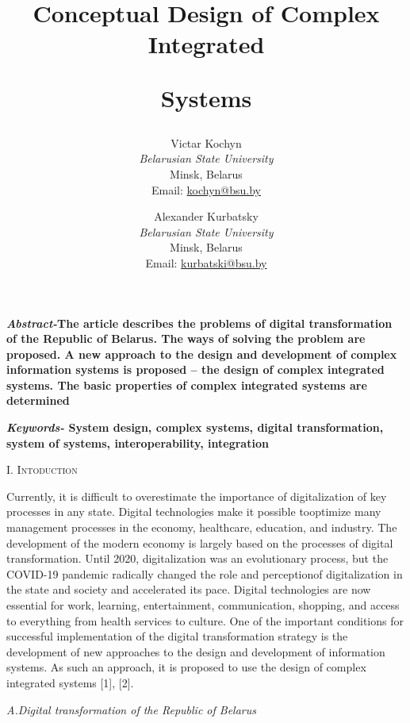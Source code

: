 \documentclass{article}
\title{Conceptual Design of Complex Integrated 
       
Systems}
\author{Victar Kochyn \\ \textit{Belarusian State University} \\ Minsk, Belarus\\ Email: \href{mailto:kochyn@bsu.by}{kochyn@bsu.by} 
   \and Alexander Kurbatsky \\ \textit{Belarusian State University} \\ Minsk, Belarus \\ Email: \href{mailto:kurbatski@bsu.by}{kurbatski@bsu.by} }
\date{}
\begin{document}
 
\maketitle

\begin{multicols}{2}
\setcounter{page}{33}
\textbf{\textit{Abstract-}The article describes the problems of digital
transformation of the Republic of Belarus. The ways of
solving the problem are proposed. A new approach to the
design and development of complex information systems
is proposed – the design of complex integrated systems.
The basic properties of complex integrated systems are
determined
}

\textbf{\textit{Keywords-} System design, complex systems, digital
transformation, system of systems, interoperability, integration}

\begin{center}
 \vspace{-3pt}
    {\large I. \textsc{Intoduction}}
\end{center}

Currently, it is difficult to overestimate the importance
of digitalization of key processes in any state. Digital
technologies make it possible tooptimize many management processes in the economy, healthcare, education,
and industry. The development of the modern economy is
largely based on the processes of digital transformation.
Until 2020, digitalization was an evolutionary process,
but the COVID-19 pandemic radically changed the role
and perceptionof digitalization in the state and society
and accelerated its pace. Digital technologies are now
essential for work, learning, entertainment, communication, shopping, and access to everything from health
services to culture. One of the important conditions for
successful implementation of the digital transformation
strategy is the development of new approaches to the
design and development of information systems. As such
an approach, it is proposed to use the design of complex
integrated systems [1], [2].
\begin{flushleft}
 {\textit{A.Digital transformation of the Republic of Belarus
}}   
\end{flushleft}



\end{multicols}
\end{document}

